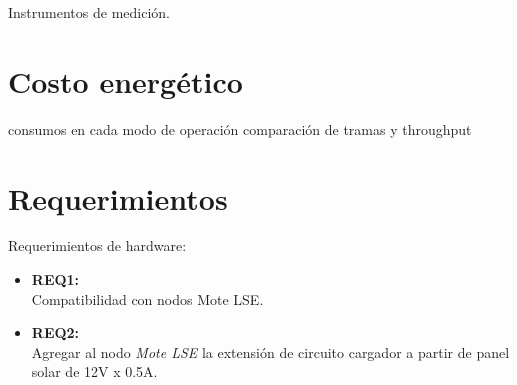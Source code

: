 Instrumentos de medición. 


\section{Costo energético}
\label{sec:costo}
consumos en cada modo de operación
comparación de tramas y throughput


\clearpage
\section{Requerimientos}
\label{sec:requerimientos}

\noindent Requerimientos de hardware:
\begin{itemize}
	\item \textbf{REQ1:}\\ Compatibilidad con nodos Mote LSE.
	\item \textbf{REQ2:}\\ Agregar al nodo \textit{Mote LSE} la extensión de circuito cargador a partir de panel solar de 12V x 0.5A.
\end{itemize}
	
